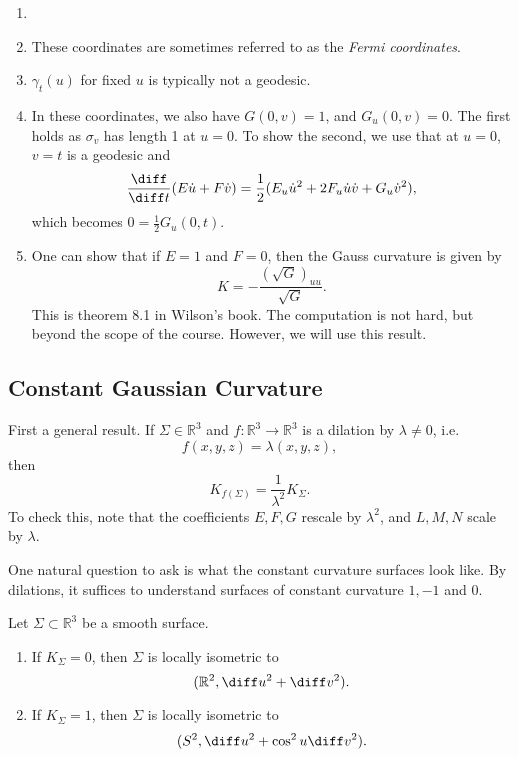 \documentclass[12pt]{article}
\begin{document}
\begin{remark}
	\begin{enumerate}
		\item[]
		\item These coordinates are sometimes referred to as the \emph{Fermi coordinates}.
		\item $\gamma_t(u)$ for fixed $u$ is typically not a geodesic.
		\item In these coordinates, we also have $G(0, v) = 1$, and $G_u(0, v) = 0$. The first holds as $\sigma_v$ has length 1 at $u = 0$. To show the second, we use that at $u = 0$, $v = t$ is a geodesic and
			\[
			\frac{\diff}{\diff t}(E \dot u + F \dot v) = \frac{1}{2} (E_u \dot u^2 + 2 F_u \dot u \dot v + G_u \dot v^2),
			\]
			which becomes $0 = \frac{1}{2}G_u (0, t)$.
		\item One can show that if $E = 1$ and $F = 0$, then the Gauss curvature is given by
			\[
				K = -\frac{(\sqrt G)_{uu}}{\sqrt G}.
			\]
			This is theorem 8.1 in Wilson's book. The computation is not hard, but beyond the scope of the course. However, we will use this result.
	\end{enumerate}
\end{remark}

\subsection{Constant Gaussian Curvature}
\label{sub:constant_gaussian_curvature}

First a general result. If $\Sigma \in \mathbb{R}^3$ and $f : \mathbb{R}^3 \to \mathbb{R}^3$ is a dilation by $\lambda \neq 0$, i.e.
\[
f(x, y, z) = \lambda(x, y, z),
\]
then
\[
K_{f(\Sigma)} = \frac{1}{\lambda^2}K_{\Sigma}.
\]
To check this, note that the coefficients $E, F, G$ rescale by $\lambda^2$, and $L, M, N$ scale by $\lambda$.

One natural question to ask is what the constant curvature surfaces look like. By dilations, it suffices to understand surfaces of constant curvature $1, -1$ and $0$.

\begin{proposition}
	Let $\Sigma \subset \mathbb{R}^3$ be a smooth surface.
	\begin{enumerate}[\normalfont(a)]
		\item If $K_{\Sigma} = 0$, then $\Sigma$ is locally isometric to
			\[
				(\mathbb{R}^2, \diff u^2 + \diff v^2).
			\]
		\item If $K_{\Sigma} = 1$, then $\Sigma$ is locally isometric to
			\[
				(S^2, \diff u^2 + \cos^2 u \diff v^2).
			\]
	\end{enumerate}
\end{proposition}
\end{document}

